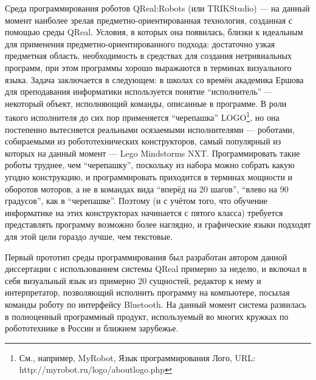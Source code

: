 Среда программирования роботов QReal:Robots (или TRIKStudio) --- на данный момент наиболее зрелая 
предметно-ориентированная технология, созданная с помощью среды QReal. 
Условия, в которых она появилась, близки к идеальным для применения 
предметно-ориентированного подхода: достаточно узкая предметная область, 
необходимость в средствах для создания нетривиальных программ, при этом
программы хорошо выражаются в терминах визуального языка. Задача заключается в 
следующем: в школах со времён академика Ершова для преподавания информатики 
используется понятие "`исполнитель"' --- некоторый объект, исполняющий команды, 
описанные в программе. В роли такого исполнителя до сих пор применяется 
"`черепашка"' 
LOGO\footnote{См., например, MyRobot, Язык программирования Лого, URL: http://myrobot.ru/logo/aboutlogo.php}, 
но она постепенно вытесняется реальными осязаемыми исполнителями --- роботами, собираемыми из робототехнических конструкторов, 
самый популярный из которых на данный момент --- Lego Mindstorms NXT. 
Программировать такие роботы труднее, чем "`черепашку"', поскольку из набора 
можно собрать какую угодно конструкцию, и программировать приходится в терминах 
мощности и оборотов моторов, а не в командах вида "`вперёд на 20 шагов"', 
"`влево на 90 градусов"', как в "`черепашке"'. Поэтому (и с учётом того, что 
обучение информатике на этих конструкторах начинается с пятого класса) требуется 
представлять программу возможно более наглядно, и графические языки подходят 
для этой цели гораздо лучше, чем текстовые. 

Первый прототип среды программирования был разработан автором данной диссертации
с использованием системы QReal примерно за неделю, и включал в себя визуальный 
язык из примерно 20 сущностей, редактор к нему и интерпретатор, позволяющий 
исполнить программу на компьютере, посылая команды роботу по интерфейсу 
\ac{Bluetooth}. На данный момент система развилась в полноценный программный продукт, 
используемый во многих кружках по робототехнике в России и ближнем зарубежье.

